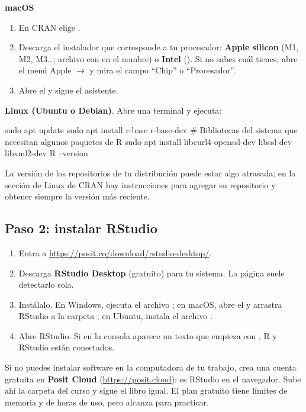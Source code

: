 \textbf{macOS}
\begin{enumerate}
  \item En CRAN elige .
  \item Descarga el instalador  que corresponde a tu
        procesador: \textbf{Apple silicon} (M1, M2, M3\ldots; archivo con
         en el nombre) o \textbf{Intel} ().
        Si no sabes cuál tienes, abre el menú Apple $\rightarrow$
         y mira el campo ``Chip'' o
        ``Procesador''.
  \item Abre el  y sigue el asistente.
\end{enumerate}

\textbf{Linux (Ubuntu o Debian)}. Abre una terminal y ejecuta:

\begin{textocodigo}
sudo apt update
sudo apt install r-base r-base-dev
# Bibliotecas del sistema que necesitan algunos paquetes de R
sudo apt install libcurl4-openssl-dev libssl-dev libxml2-dev
R --version
\end{textocodigo}

La versión de los repositorios de tu distribución puede estar algo
atrasada; en la sección de Linux de CRAN hay instrucciones para agregar su
repositorio y obtener siempre la versión más reciente.

\subsection{Paso 2: instalar RStudio}

\begin{enumerate}
  \item Entra a \url{https://posit.co/download/rstudio-desktop/}.
  \item Descarga \textbf{RStudio Desktop} (gratuito) para tu sistema. La
        página suele detectarlo sola.
  \item Instálalo. En Windows, ejecuta el archivo ; en
        macOS, abre el  y arrastra RStudio a la carpeta
        ; en Ubuntu, instala el archivo
        .
  \item Abre RStudio. Si en la consola aparece un texto que empieza con
        , R y RStudio están conectados.
\end{enumerate}

\begin{consejo}
Si no puedes instalar software en la computadora de tu trabajo, crea una
cuenta gratuita en \textbf{Posit Cloud} (\url{https://posit.cloud}): es
RStudio en el navegador. Sube ahí la carpeta del curso y sigue el libro
igual. El plan gratuito tiene límites de memoria y de horas de uso, pero
alcanza para practicar.
\end{consejo}

